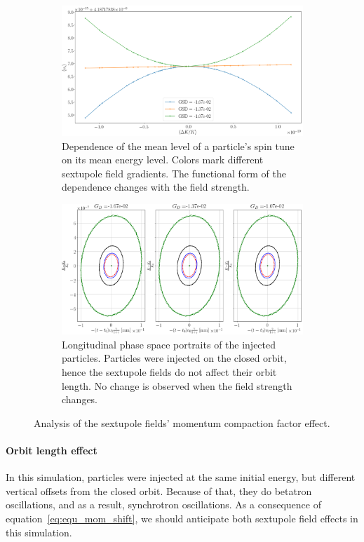 \documentclass[preprint, review]{elsarticle}
\begin{document}
\begin{figure}[h]\centering
  \begin{subfigure}{\linewidth}
    \includegraphics[width=\linewidth]{img/decoh/STDK_3SS_D}
    \caption{Dependence of the mean level of a particle's spin tune on its mean energy level.
      Colors mark different sextupole field gradients.
      The functional form of the dependence changes with the field strength.\label{fig:sext:MCM_effect}}
  \end{subfigure}
  \begin{subfigure}{\linewidth}
    \includegraphics[width=\linewidth]{img/decoh/LPS_3SS_D}
    \caption{Longitudinal phase space portraits of the injected particles.
      Particles were injected on the closed orbit, hence the sextupole fields do not affect their orbit length.
      No change is observed when the field strength changes.\label{fig:sext:MCM_effect:LPS}}
  \end{subfigure}
  \caption{Analysis of the sextupole fields' momentum compaction factor effect.}
\end{figure}

\paragraph{Orbit length effect}
In this simulation, particles were injected at the same initial energy, but different vertical offsets
from the closed orbit. Because of that, they do betatron oscillations, and as a result, synchrotron oscillations.
As a consequence of equation~\eqref{eq:equ_mom_shift}, we should anticipate both sextupole field effects
in this simulation.
\end{document}
